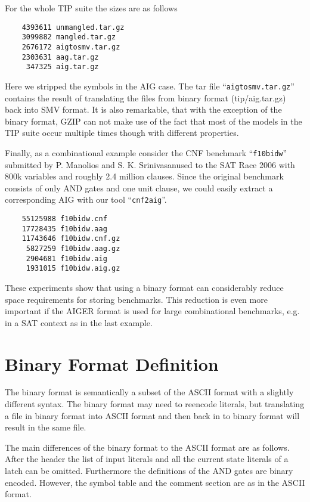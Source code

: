 \documentclass[10pt]{llncs}
\begin{document}
  For the whole TIP suite the sizes are as follows
\begin{verbatim}
    4393611 unmangled.tar.gz
    3099882 mangled.tar.gz
    2676172 aigtosmv.tar.gz
    2303631 aag.tar.gz
     347325 aig.tar.gz
\end{verbatim}
  Here we stripped the symbols in the AIG case.  The tar file
  ``\texttt{aigtosmv.tar.gz}'' contains the result of translating the files from binary
  format (tip/aig.tar.gz) back into SMV format.  It is also remarkable, that
  with the exception of the binary format, GZIP can not make use of the fact
  that most of the models in the TIP suite occur multiple times though with
  different properties.

  Finally, as a combinational example consider the CNF benchmark
  ``\texttt{f10bidw}''
  submitted by P. Manolios and S. K. Srinivasanused to the SAT Race 2006
  with 800k variables and roughly 2.4 million clauses.  Since the original
  benchmark consists of only AND gates and one unit clause, we could easily
  extract a corresponding AIG with our tool ``\texttt{cnf2aig}''.
\begin{verbatim}
    55125988 f10bidw.cnf
    17728435 f10bidw.aag
    11743646 f10bidw.cnf.gz
     5827259 f10bidw.aag.gz
     2904681 f10bidw.aig
     1931015 f10bidw.aig.gz
\end{verbatim}
  These experiments show that using a binary format can considerably reduce
  space requirements for storing benchmarks.  This reduction is even more
  important if the AIGER format is used for large combinational benchmarks,
  e.g. in a SAT context as in the last example.
  
\section{Binary Format Definition}

  The binary format is semantically a subset of the ASCII format with a
  slightly different syntax.  The binary format may need to reencode
  literals, but translating a file in binary format into ASCII format and
  then back in to binary format will result in the same file.

  The main differences of the binary format to the ASCII format are as
  follows.  After the header the list of input literals and all the
  current state literals of a latch can be omitted.  Furthermore the
  definitions of the AND gates are binary encoded.  However, the symbol
  table and the comment section are as in the ASCII format.
\end{document}
